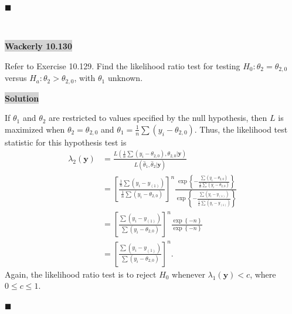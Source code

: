 \documentclass[12pt]{article}
\newcommand{\mybox}{%
    \collectbox{%
        \setlength{\fboxsep}{2pt}%
        \fbox{\BOXCONTENT}%
    }%
}
\begin{document}
\hfill$\blacksquare$

\vfill
\begin{center}
\end{center}
\begin{center}
\vspace{-0.6cm}
\hrulefill \\
\vspace{-0.7cm}
\hrulefill
\end{center}

\pagebreak

\noindent\mybox{\colorbox{lightgray}{\textbf{Wackerly 10.130}}}\hspace{3mm}\hrulefill 

\noindent Refer to Exercise 10.129. Find the likelihood ratio test for testing $H_0: \theta_2 = \theta_{2,0}$ versus $H_a: \theta_2 > \theta_{2,0}$, with $\theta_1$ unknown. 

\noindent\mybox{\colorbox{lightgray}{\textbf{Solution}}} \hspace{3mm}\hrulefill

\noindent If $\theta_1$ and $\theta_2$ are restricted to values specified by the null hypothesis, then $L$ is maximized when $\theta_2 = \theta_{2,0}$ and $\theta_1 = \frac{1}{n}\sum(y_i-\theta_{2,0})$. Thus, the likelihood test statistic for this hypothesis test is
\begin{align}
\lambda_2(\textbf{y}) &= \frac{L\left(\frac{1}{n}\sum(y_i - \theta_{2,0}), \theta_{2,0} | \textbf{y}\right)}{L(\hat{\theta}_1, \hat{\theta}_2|\textbf{y})} \\
&= \left[\frac{\frac{1}{n}\sum(y_i-y_{(1)})}{\frac{1}{n}\sum(y_i-\theta_{2,0})}\right]^n \frac{\exp\left\lbrace -\frac{\sum(y_i-\theta_{2,0})}{\frac{1}{n}\sum(y_i-\theta_{2,0})}\right\rbrace}{\exp\left\lbrace -\frac{\sum(y_i-y_{(1)})}{\frac{1}{n}\sum(y_i-y_{(1)})}\right\rbrace} \\
&= \left[\frac{\sum(y_i-y_{(1)})}{\sum(y_i-\theta_{2,0})}\right]^n \frac{\exp\left\lbrace-n\right\rbrace}{\exp\left\lbrace-n\right\rbrace} \\
&= \left[\frac{\sum(y_i-y_{(1)})}{\sum(y_i-\theta_{2,0})}\right]^n. 
\end{align}
Again, the likelihood ratio test is to reject $H_0$ whenever $\lambda_1(\textbf{y}) < c$, where $0\leq c \leq 1$.

\hfill$\blacksquare$

\vfill
\begin{center}
\end{center}
\begin{center}
\vspace{-0.6cm}
\hrulefill \\
\vspace{-0.7cm}
\hrulefill
\end{center}

\pagebreak
\end{document}
